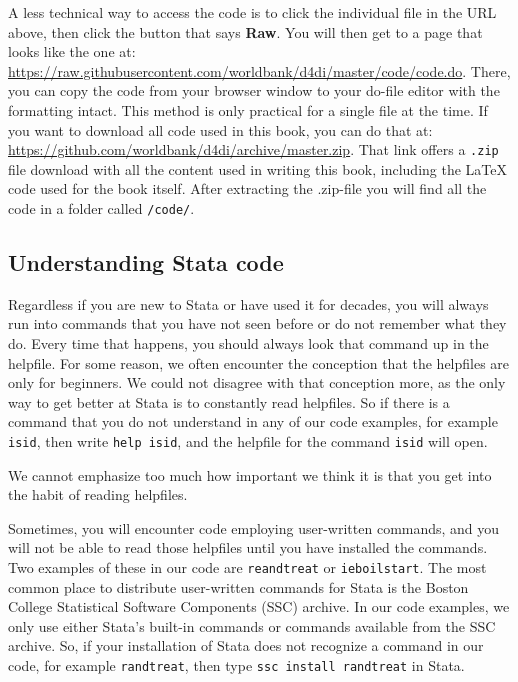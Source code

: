 A less technical way to access the code is to click the individual file in the URL above, then click
the button that says \textbf{Raw}. You will then get to a page that looks like the one at:
\url{https://raw.githubusercontent.com/worldbank/d4di/master/code/code.do}.
There, you can copy the code from your browser window to your do-file editor with the formatting intact.
This method is only practical for a single file at the time.
If you want to download all code used in this book, you can do that at:
\url{https://github.com/worldbank/d4di/archive/master.zip}. That link offers a \texttt{.zip} file download
with all the content used in writing this book, including the \LaTeX{} code used for the book itself. After
extracting the .zip-file you will find all the code in a folder called \texttt{/code/}.

\subsection{Understanding Stata code}

Regardless if you are new to Stata or have used it for decades, you will always run into commands that
you have not seen before or do not remember what they do. Every time that happens, you should always look
that command up in the helpfile. For some reason, we often encounter the conception that the helpfiles
are only for beginners. We could not disagree with that conception more, as the only way to get better at Stata
is to constantly read helpfiles. So if there is a command that you do not understand in any of our code
examples, for example \texttt{isid}, then write \texttt{help isid}, and the helpfile for the command \texttt{isid} will open.

We cannot emphasize too much how important we think it is that you get into the habit of reading helpfiles.

Sometimes, you will encounter code employing user-written commands,
and you will not be able to read those helpfiles until you have installed the commands.
Two examples of these in our code are \texttt{reandtreat} or \texttt{ieboilstart}.
The most common place to distribute user-written commands for Stata is the Boston College Statistical Software Components
(SSC) archive. In our code examples, we only use either Stata's built-in commands or commands available from the
SSC archive. So, if your installation of Stata does not recognize a command in our code, for example
\texttt{randtreat}, then type \texttt{ssc install randtreat} in Stata.

